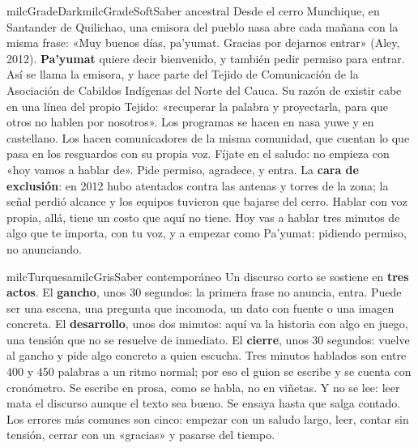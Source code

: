 \documentclass[11pt,letterpaper]{article}
\begin{document}
\begin{softbox}{milcGradeDark}{milcGradeSoft}{Saber ancestral}
Desde el cerro Munchique, en Santander de Quilichao, una emisora del pueblo nasa abre cada mañana con la misma frase: «Muy buenos días, pa'yumat. Gracias por dejarnos entrar» (Aley, 2012). \textbf{Pa'yumat} quiere decir bienvenido, y también pedir permiso para entrar. Así se llama la emisora, y hace parte del Tejido de Comunicación de la Asociación de Cabildos Indígenas del Norte del Cauca. Su razón de existir cabe en una línea del propio Tejido: «recuperar la palabra y proyectarla, para que otros no hablen por nosotros». Los programas se hacen en nasa yuwe y en castellano. Los hacen comunicadores de la misma comunidad, que cuentan lo que pasa en los resguardos con su propia voz. Fíjate en el saludo: no empieza con «hoy vamos a hablar de». Pide permiso, agradece, y entra. La \textbf{cara de exclusión}: en 2012 hubo atentados contra las antenas y torres de la zona; la señal perdió alcance y los equipos tuvieron que bajarse del cerro. Hablar con voz propia, allá, tiene un costo que aquí no tiene. Hoy vas a hablar tres minutos de algo que te importa, con tu voz, y a empezar como Pa'yumat: pidiendo permiso, no anunciando.\par{}
\end{softbox}

\begin{softbox}{milcTurquesa}{milcGris}{Saber contemporáneo}
Un discurso corto se sostiene en \textbf{tres actos}. El \textbf{gancho}, unos 30 segundos: la primera frase no anuncia, entra. Puede ser una escena, una pregunta que incomoda, un dato con fuente o una imagen concreta. El \textbf{desarrollo}, unos dos minutos: aquí va la historia con algo en juego, una tensión que no se resuelve de inmediato. El \textbf{cierre}, unos 30 segundos: vuelve al gancho y pide algo concreto a quien escucha. Tres minutos hablados son entre 400 y 450 palabras a un ritmo normal; por eso el guion se escribe y se cuenta con cronómetro. Se escribe en prosa, como se habla, no en viñetas. Y no se lee: leer mata el discurso aunque el texto sea bueno. Se ensaya hasta que salga contado. Los errores más comunes son cinco: empezar con un saludo largo, leer, contar sin tensión, cerrar con un «gracias» y pasarse del tiempo.
\end{softbox}
\end{document}
